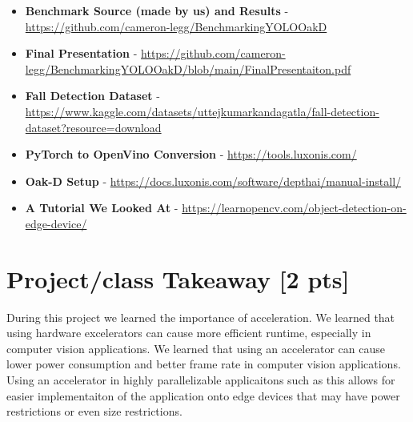 \documentclass[sigconf,authorversion,nonacm]{acmart}
\begin{document}
\begin{itemize}
    \item \textbf{Benchmark Source (made by us) and Results} - \href{https://github.com/cameron-legg/BenchmarkingYOLOOakD}{https://github.com/cameron-legg/BenchmarkingYOLOOakD}
    \item \textbf{Final Presentation} - \href{https://github.com/cameron-legg/BenchmarkingYOLOOakD/blob/main/FinalPresentaiton.pdf}{https://github.com/cameron-legg/BenchmarkingYOLOOakD/blob/main/FinalPresentaiton.pdf}
    \item \textbf{Fall Detection Dataset} - \href{https://www.kaggle.com/datasets/uttejkumarkandagatla/fall-detection-dataset?resource=download}{https://www.kaggle.com/datasets/uttejkumarkandagatla/fall-detection-dataset?resource=download}
    \item \textbf{PyTorch to OpenVino Conversion} - \href{https://tools.luxonis.com/}{https://tools.luxonis.com/}
    \item \textbf{Oak-D Setup} - \href{https://docs.luxonis.com/software/depthai/manual-install/}{https://docs.luxonis.com/software/depthai/manual-install/}
    \item \textbf{A Tutorial We Looked At} - \href{https://learnopencv.com/object-detection-on-edge-device/}{https://learnopencv.com/object-detection-on-edge-device/}
\end{itemize}

\section{Project/class Takeaway {\small {[2 pts]}}}  


During this project we learned the importance of acceleration. We learned that using hardware excelerators can cause more efficient runtime, especially in computer vision applications. We learned that using an accelerator can cause lower power consumption and better frame rate in computer vision applications. Using an accelerator in highly parallelizable applicaitons such as this allows for easier implementaiton of the application onto edge devices that may have power restrictions or even size restrictions.
\end{document}
